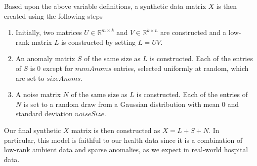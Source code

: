 \documentclass[conference]{IEEEtran}
\begin{document}
Based upon the above variable definitions, a synthetic data matrix $X$ is then created using the following steps
\begin{enumerate}
\item Initially, two matrices $U \in \mathbb{R}^{m \times k}$ and $V \in \mathbb{R}^{k \times n}$ are constructed and a low-rank matrix $L$ is constructed by setting $L = UV$.
\item An anomaly matrix $S$ of the same size as $L$ is constructed.  Each of the entries of $S$ is $0$ except for $numAnoms$ entries, selected uniformly at random, which are set to $sizeAnoms$.
\item A noise matrix $N$ of the same size as $L$ is constructed. Each of the entries of $N$ is set to a random draw from a Gaussian distribution with mean $0$ and standard deviation $noiseSize$.
\end{enumerate}
\noindent Our final synthetic $X$ matrix is then constructed as $X=L+S+N$.  In particular, this model is faithful to our health data since it is a combination of low-rank ambient data and sparse anomalies, as we expect in real-world hospital data.
\end{document}
